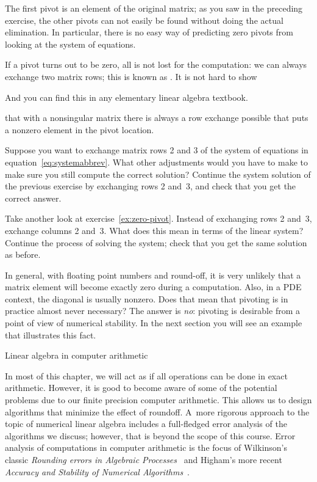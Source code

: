 The first pivot is an element of the original matrix; as you saw in
the preceding exercise, the other pivots can not easily be found
without doing the actual elimination. In particular, there is no easy
way of predicting zero pivots from looking at the system of equations.

If a pivot turns out to be zero, all is not lost for the computation:
we can always exchange two matrix rows; this is known as
.  It is not hard to show
\begin{footnoteenv}
  {And you can
    find this in any elementary linear algebra textbook.}
\end{footnoteenv}
that with a
nonsingular matrix there is always a row exchange possible that puts a
nonzero element in the pivot location.

\begin{exercise}
  Suppose you want to exchange matrix rows 2 and 3 of the system of
  equations in equation~\eqref{eq:systemabbrev}. What other
  adjustments would you have to make to make sure you still compute the
  correct solution? 
  Continue the system solution of the previous exercise
  by exchanging rows 2 and~3, and check that you get the correct answer.
\end{exercise}

\begin{exercise}
  Take another look at exercise~\ref{ex:zero-pivot}.  Instead of
  exchanging rows 2 and~3, exchange columns 2 and~3. What does this
  mean in terms of the linear system? Continue the
  process of solving the system; check that you get the same solution
  as before.
\end{exercise}

In general, with floating point numbers and round-off, it is very
unlikely that a matrix element will become exactly zero during a
computation. Also, in a \ac{PDE} context, the diagonal is usually nonzero.
Does that mean that pivoting is in practice almost never
necessary? The answer is \emph{no}: pivoting is desirable from a point
of view of numerical stability. In the next section you will see an
example that illustrates this fact.

 {Linear algebra in computer arithmetic}
\label{sec:linear-arith}

In most of this chapter, we will act as if all operations
can be done in exact arithmetic. However, it is good to become aware
of some of the potential problems due to our finite precision computer
arithmetic. This allows us to design algorithms that minimize the effect
of roundoff. A~more rigorous approach to the topic of numerical linear
algebra includes a full-fledged error analysis of the algorithms we
discuss; however, that is beyond the scope of this course.
%
Error analysis of computations in computer arithmetic is the focus of
Wilkinson's classic {\it Rounding errors in Algebraic
  Processes}~\cite{Wilkinson:roundoff} and Higham's more recent {\it
  Accuracy and Stability of Numerical
  Algorithms}~\cite{Higham:2002:ASN}. 

